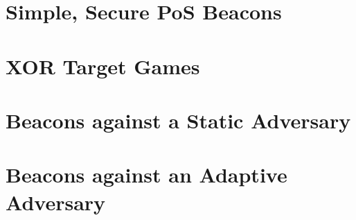 \chapter{Simple, Secure PoS Beacons}
\label{sec:xor-games-intro}


\chapter{XOR Target Games}\label{sec:xor-games}


\chapter{Beacons against a Static Adversary}\label{app:bernoulli}


% 

\chapter{Beacons against an Adaptive Adversary}\label{sec:composing-xor-games}\label{sec:beacon}






